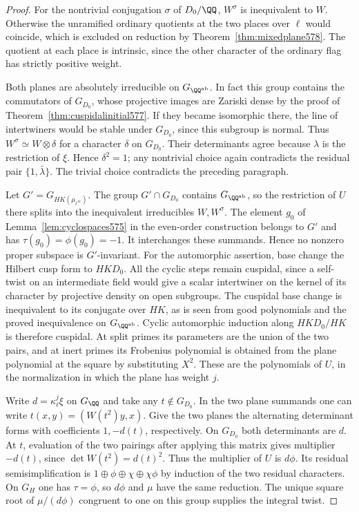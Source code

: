\documentclass[a4paper,11pt]{article}
\theoremstyle{definition}
\theoremstyle{remark}
\numberwithin{equation}{section}
\begin{document}
\begin{proof}
For the nontrivial conjugation \(\sigma\) of \(D_0/\QQ\),
\(W^\sigma\) is inequivalent to \(W\). Otherwise the
unramified ordinary quotients at the two places over
\(\ell\) would coincide, which is excluded on reduction
by Theorem~\ref{thm:mixedplane578}. The quotient at each
place is intrinsic, since the other character of the
ordinary flag has strictly positive weight.

Both planes are absolutely irreducible on \(G_{\QQ^{\rm ab}}\).
In fact this group contains the commutators of \(G_{D_0}\),
whose projective images are Zariski dense by the proof
of Theorem~\ref{thm:cuspidalinitial577}. If they became
isomorphic there, the line of intertwiners would be stable
under \(G_{D_0}\), since this subgroup is normal. Thus
\(W^\sigma\simeq W\otimes\delta\) for a character \(\delta\)
on \(G_{D_0}\). Their determinants agree because \(\lambda\)
is the restriction of \(\xi\). Hence \(\delta^2=1\); any
nontrivial choice again contradicts the residual pair
\(\{1,\bar\lambda\}\). The trivial choice contradicts
the preceding paragraph.

Let \(G'=G_{HK(\mu_{\ell^\infty})}\). The group
\(G'\cap G_{D_0}\) contains \(G_{\QQ^{\rm ab}}\), so the
restriction of \(U\) there splits into the inequivalent
irreducibles \(W,W^\sigma\). The element \(g_0\) of
Lemma~\ref{lem:cyclospaces575} in the even-order construction
belongs to \(G'\) and has \(\tau(g_0)=\phi(g_0)=-1\).
It interchanges these summands. Hence no nonzero proper
subspace is \(G'\)-invariant. For the automorphic assertion,
base change the Hilbert cusp form to \(HKD_0\). All the
cyclic steps remain cuspidal, since a self-twist on an
intermediate field would give a scalar intertwiner on the
kernel of its character by projective density on open
subgroups. The cuspidal base change is inequivalent to its
conjugate over \(HK\), as is seen from good polynomials
and the proved inequivalence on \(G_{\QQ^{\rm ab}}\).
Cyclic automorphic induction along \(HKD_0/HK\) is therefore
cuspidal. At split primes its parameters are the union of
the two pairs, and at inert primes its Frobenius polynomial
is obtained from the plane polynomial at the square by
substituting \(X^2\). These are the polynomials of \(U\),
in the normalization in which the plane has weight \(j\).
~\cite{XII-IX-I-ac123}

Write \(d=\kappa_\ell^j\xi\) on \(G_\QQ\) and take any
\(t\notin G_{D_0}\). In the two plane summands one can
write \(t(x,y)=(W(t^2)y,x)\). Give the two planes the
alternating determinant forms with coefficients \(1,-d(t)\),
respectively. On \(G_{D_0}\) both determinants are \(d\).
At \(t\), evaluation of the two pairings after applying
this matrix gives multiplier \(-d(t)\), since
\(\det W(t^2)=d(t)^2\). Thus the multiplier of \(U\) is
\(d\phi\). Its residual semisimplification is
\(1\oplus\phi\oplus\chi\oplus\chi\phi\) by induction of
the two residual characters. On \(G_H\) one has
\(\tau=\phi\), so \(d\phi\) and \(\mu\) have the same
reduction. The unique square root of \(\mu/(d\phi)\)
congruent to one on this group supplies the integral twist.
\end{proof}
\end{document}
